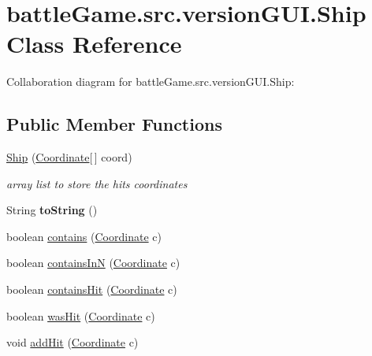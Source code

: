 \hypertarget{classbattleGame_1_1src_1_1versionGUI_1_1Ship}{}\section{battle\+Game.\+src.\+version\+G\+U\+I.\+Ship Class Reference}
\label{classbattleGame_1_1src_1_1versionGUI_1_1Ship}


Collaboration diagram for battle\+Game.\+src.\+version\+G\+U\+I.\+Ship\+:
\subsection*{Public Member Functions}
\begin{DoxyCompactItemize}
\item 
\hyperlink{classbattleGame_1_1src_1_1versionGUI_1_1Ship_a7bd1bce83fe67ee8e4c6a96372381837}{Ship} (\hyperlink{classbattleGame_1_1src_1_1versionGUI_1_1Coordinate}{Coordinate}\mbox{[}$\,$\mbox{]} coord)
\begin{DoxyCompactList}\small\item\em array list to store the hits coordinates \end{DoxyCompactList}\item 
String {\bfseries to\+String} ()\hypertarget{classbattleGame_1_1src_1_1versionGUI_1_1Ship_afa748aaee877a39fee1d13401b41dd7c}{}\label{classbattleGame_1_1src_1_1versionGUI_1_1Ship_afa748aaee877a39fee1d13401b41dd7c}

\item 
boolean \hyperlink{classbattleGame_1_1src_1_1versionGUI_1_1Ship_ac65608a8831b27a71579314747a6bc89}{contains} (\hyperlink{classbattleGame_1_1src_1_1versionGUI_1_1Coordinate}{Coordinate} c)
\item 
boolean \hyperlink{classbattleGame_1_1src_1_1versionGUI_1_1Ship_a0dd7e49ea5feec27bbaee3b9f9cd66d8}{contains\+InN} (\hyperlink{classbattleGame_1_1src_1_1versionGUI_1_1Coordinate}{Coordinate} c)
\item 
boolean \hyperlink{classbattleGame_1_1src_1_1versionGUI_1_1Ship_a31d2b0eb16ee831ab65e1d751a7e59f5}{contains\+Hit} (\hyperlink{classbattleGame_1_1src_1_1versionGUI_1_1Coordinate}{Coordinate} c)
\item 
boolean \hyperlink{classbattleGame_1_1src_1_1versionGUI_1_1Ship_a36f114b2cba1fd67f7cf09ceff275065}{was\+Hit} (\hyperlink{classbattleGame_1_1src_1_1versionGUI_1_1Coordinate}{Coordinate} c)
\item 
void \hyperlink{classbattleGame_1_1src_1_1versionGUI_1_1Ship_a8e9bbc0a7f003a599d62d435278d2bc8}{add\+Hit} (\hyperlink{classbattleGame_1_1src_1_1versionGUI_1_1Coordinate}{Coordinate} c)
\end{DoxyCompactItemize}


